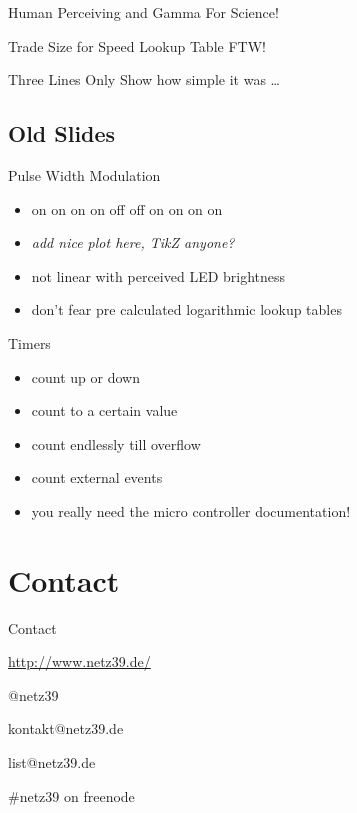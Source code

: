 \documentclass{beamer}
\begin{document}
\begin{frame}{Human Perceiving and Gamma}
    For Science!
\end{frame}

\begin{frame}{Trade Size for Speed}
    Lookup Table FTW!
\end{frame}

\begin{frame}{Three Lines Only}
    Show how simple it was …
\end{frame}

\subsection{Old Slides}

\begin{frame}{Pulse Width Modulation}
    \begin{itemize}
        \item on on on on off off on on on on
        \pause
        \item \emph{add nice plot here, TikZ anyone?}
        \pause
        \item not linear with perceived LED brightness
        \item don't fear pre calculated logarithmic lookup tables
    \end{itemize}
\end{frame}

\begin{frame}{Timers}
    \begin{itemize}
        \item count up or down
        \item count to a certain value
        \item count endlessly till overflow
        \item count external events
        \pause
        \item you really need the micro controller documentation!
    \end{itemize}
\end{frame}

\section{Contact}

\begin{frame}{Contact}
    \begin{center}
        \begin{description}
            \item[WWW] \url{http://www.netz39.de/}
            \item[Twitter/identi.ca] @netz39
            \item[E-Mail] kontakt@netz39.de
            \item[Mailingliste] list@netz39.de
            \item[IRC] \#netz39 on freenode
        \end{description}
    \end{center}
\end{frame}
\end{document}
